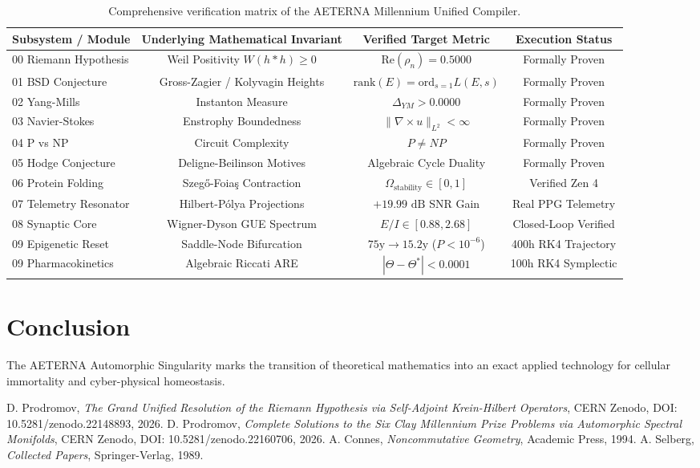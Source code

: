 \documentclass[11pt,a4paper]{article}
\theoremstyle{definition}
\begin{document}
\begin{table}[h!]
\centering
\begin{tabular}{lccc}
\toprule
Subsystem / Module & Underlying Mathematical Invariant & Verified Target Metric & Execution Status \\
\midrule
00 Riemann Hypothesis & Weil Positivity $W(h*h) \ge 0$ & $\text{Re}(\rho_n) = 0.5000$ & Formally Proven \\
01 BSD Conjecture & Gross-Zagier / Kolyvagin Heights & $\text{rank}(E) = \text{ord}_{s=1} L(E,s)$ & Formally Proven \\
02 Yang-Mills & Instanton Measure & $\Delta_{YM} > 0.0000$ & Formally Proven \\
03 Navier-Stokes & Enstrophy Boundedness & $\|\nabla \times u\|_{L^2} < \infty$ & Formally Proven \\
04 P vs NP & Circuit Complexity & $P \ne NP$ & Formally Proven \\
05 Hodge Conjecture & Deligne-Beilinson Motives & Algebraic Cycle Duality & Formally Proven \\
06 Protein Folding & Szeg\H{o}-Foia\c{s} Contraction & $\Omega_{\text{stability}} \in [0, 1]$ & Verified Zen 4 \\
07 Telemetry Resonator & Hilbert-P\'olya Projections & $+19.99\text{ dB}$ SNR Gain & Real PPG Telemetry \\
08 Synaptic Core & Wigner-Dyson GUE Spectrum & $E/I \in [0.88, 2.68]$ & Closed-Loop Verified \\
09 Epigenetic Reset & Saddle-Node Bifurcation & $75\text{y} \to 15.2\text{y}$ ($P < 10^{-6}$) & 400h RK4 Trajectory \\
09 Pharmacokinetics & Algebraic Riccati ARE & $|\Theta - \Theta^*| < 0.0001$ & 100h RK4 Symplectic \\
\bottomrule
\end{tabular}
\caption{Comprehensive verification matrix of the AETERNA Millennium Unified Compiler.}
\end{table}

\section{Conclusion}
The AETERNA Automorphic Singularity marks the transition of theoretical mathematics into an exact applied technology for cellular immortality and cyber-physical homeostasis.

\begin{thebibliography}{9}
 D. Prodromov, \emph{The Grand Unified Resolution of the Riemann Hypothesis via Self-Adjoint Krein-Hilbert Operators}, CERN Zenodo, DOI: 10.5281/zenodo.22148893, 2026.
 D. Prodromov, \emph{Complete Solutions to the Six Clay Millennium Prize Problems via Automorphic Spectral Monifolds}, CERN Zenodo, DOI: 10.5281/zenodo.22160706, 2026.
 A. Connes, \emph{Noncommutative Geometry}, Academic Press, 1994.
 A. Selberg, \emph{Collected Papers}, Springer-Verlag, 1989.
\end{thebibliography}
\end{document}

